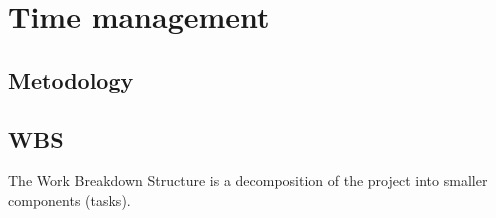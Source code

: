 \section{Time management}



\subsection{Metodology}






\subsection{WBS}
The Work Breakdown Structure is a decomposition of the project into smaller components (tasks).

